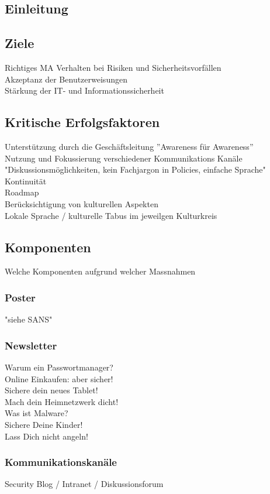 \documentclass[../../main.tex]{subfiles}
\begin{document}
\subsection{Einleitung}
\subsection{Ziele}
  Richtiges MA Verhalten bei Risiken und Sicherheitsvorfällen\\
  Akzeptanz der Benutzerweisungen\\
  Stärkung der IT- und Informationssicherheit
\subsection{Kritische Erfolgsfaktoren}
  Unterstützung durch die Geschäftsleitung ''Awareness für Awareness''\\
  Nutzung und Fokussierung verschiedener Kommunikations Kanäle\\
    "Diskussionsmöglichkeiten, kein Fachjargon in Policies, einfache Sprache"\\
  Kontinuität\\
  Roadmap\\
  Berücksichtigung von kulturellen Aspekten\\
  Lokale Sprache / kulturelle Tabus im jeweilgen Kulturkreis
\subsection{Komponenten}
  Welche Komponenten aufgrund welcher Massnahmen
\subsubsection{Poster}
    "siehe SANS"
\subsubsection{Newsletter}
    Warum ein Passwortmanager?\\
    Online Einkaufen: aber sicher!\\
    Sichere dein neues Tablet!\\
    Mach dein Heimnetzwerk dicht!\\
    Was ist Malware?\\
    Sichere Deine Kinder!\\
    Lass Dich nicht angeln!
\subsubsection{Kommunikationskanäle}
    Security Blog / Intranet / Diskussionsforum
\end{document}
